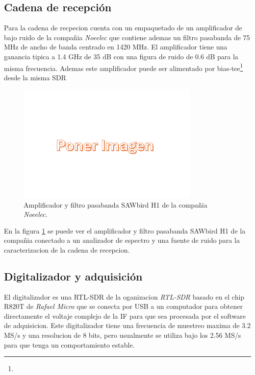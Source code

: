 \subsection{Cadena de recepción}

Para la cadena de recpecion cuenta con un empaquetado de un amplificador de bajo ruido de la compañia \textit{Noeelec} que contiene ademas un filtro pasabanda de 75 MHz de ancho de banda centrado en 1420 MHz. El amplificador tiene una ganancia tipica a 1.4 GHz de 35 dB con una figura de ruido de 0.6 dB para la misma frecuencia. Ademas este amplificador puede ser alimentado por bias-tee\footnote{} desde la misma SDR\\

\begin{figure}
    \centering
    \includegraphics[width=0.8\textwidth]{img/imagen}
    \caption{Amplificador y filtro pasabanda SAWbird H1 de la compañia \textit{Noeelec}.}
    \label{fig:cadena}
\end{figure}

En la figura \ref{fig:cadena} se puede ver el amplificador y filtro pasabanda SAWbird H1 de la compañia conectado a un analizador de espectro y una fuente de ruido para la caracterizacion de la cadena de recepcion.\\

\subsection{Digitalizador y adquisición}

El digitalizador es una RTL-SDR de la oganizacion \textit{RTL-SDR} basado en el chip R820T de \textit{Rafael Micro} que se conecta por USB a un computador para obtener directamente el voltaje complejo de la IF para que sea procesada por el software de adquisicion. Este digitalizador tiene una frecuencia de muestreo maxima de 3.2 MS/s y una resolucion de 8 bits, pero usualmente se utiliza bajo los 2.56 MS/s para que tenga un comportamiento estable\cite{RTLSDR2018}.\\

